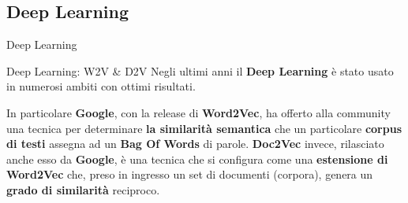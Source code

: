 \documentclass[british]{beamer}
\begin{document}
\subsection{Deep Learning}
	
\begin{frame}{Deep Learning}
	\begin{figure}[!hf]
		\centering
	\end{figure}
\end{frame}
	
\begin{frame}{Deep Learning: W2V \& D2V}
	Negli ultimi anni il \textbf{Deep Learning} \`{e} stato usato in numerosi ambiti con ottimi risultati.\par
	In particolare \textbf{Google}, con la release di \textbf{Word2Vec}, ha offerto alla community una tecnica per determinare \textbf{la similarit\`{a} semantica} che un particolare \textbf{corpus di testi} assegna ad un \textbf{Bag Of Words} di parole.
	\textbf{Doc2Vec} invece, rilasciato anche esso da \textbf{Google}, \`{e} una tecnica che si configura come una \textbf{estensione di Word2Vec} che, preso in ingresso un set di documenti (corpora), genera un \textbf{grado di similarit\`{a}} reciproco.
\end{frame}
\end{document}
